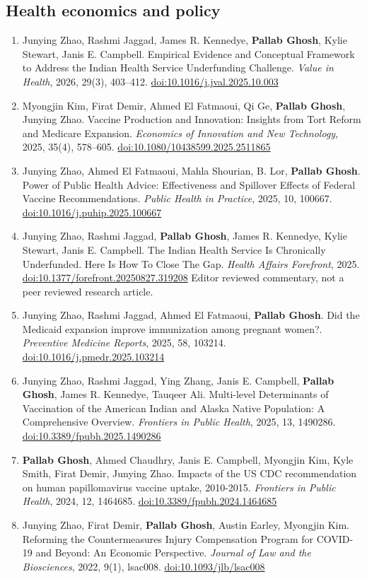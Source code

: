 \documentclass[10.5pt]{article}
\begin{document}
\subsection{Health economics and policy}
\begin{enumerate}
\item Junying Zhao, Rashmi Jaggad, James R. Kennedye, \textbf{Pallab Ghosh}, Kylie Stewart, Janis E. Campbell. Empirical Evidence and Conceptual Framework to Address the Indian Health Service Underfunding Challenge. \emph{Value in Health}, 2026, 29(3), 403--412. \href{https://doi.org/10.1016/j.jval.2025.10.003}{doi:10.1016/j.jval.2025.10.003}
\item Myongjin Kim, Firat Demir, Ahmed El Fatmaoui, Qi Ge, \textbf{Pallab Ghosh}, Junying Zhao. Vaccine Production and Innovation: Insights from Tort Reform and Medicare Expansion. \emph{Economics of Innovation and New Technology}, 2025, 35(4), 578--605. \href{https://doi.org/10.1080/10438599.2025.2511865}{doi:10.1080/10438599.2025.2511865}
\item Junying Zhao, Ahmed El Fatmaoui, Mahla Shourian, B. Lor, \textbf{Pallab Ghosh}. Power of Public Health Advice: Effectiveness and Spillover Effects of Federal Vaccine Recommendations. \emph{Public Health in Practice}, 2025, 10, 100667. \href{https://doi.org/10.1016/j.puhip.2025.100667}{doi:10.1016/j.puhip.2025.100667}
\item Junying Zhao, Rashmi Jaggad, \textbf{Pallab Ghosh}, James R. Kennedye, Kylie Stewart, Janis E. Campbell. The Indian Health Service Is Chronically Underfunded. Here Is How To Close The Gap. \emph{Health Affairs Forefront}, 2025. \href{https://doi.org/10.1377/forefront.20250827.319208}{doi:10.1377/forefront.20250827.319208} {\footnotesize Editor reviewed commentary, not a peer reviewed research article.}
\item Junying Zhao, Rashmi Jaggad, Ahmed El Fatmaoui, \textbf{Pallab Ghosh}. Did the Medicaid expansion improve immunization among pregnant women?. \emph{Preventive Medicine Reports}, 2025, 58, 103214. \href{https://doi.org/10.1016/j.pmedr.2025.103214}{doi:10.1016/j.pmedr.2025.103214}
\item Junying Zhao, Rashmi Jaggad, Ying Zhang, Janis E. Campbell, \textbf{Pallab Ghosh}, James R. Kennedye, Tauqeer Ali. Multi-level Determinants of Vaccination of the American Indian and Alaska Native Population: A Comprehensive Overview. \emph{Frontiers in Public Health}, 2025, 13, 1490286. \href{https://doi.org/10.3389/fpubh.2025.1490286}{doi:10.3389/fpubh.2025.1490286}
\item \textbf{Pallab Ghosh}, Ahmed Chaudhry, Janis E. Campbell, Myongjin Kim, Kyle Smith, Firat Demir, Junying Zhao. Impacts of the US CDC recommendation on human papillomavirus vaccine uptake, 2010-2015. \emph{Frontiers in Public Health}, 2024, 12, 1464685. \href{https://doi.org/10.3389/fpubh.2024.1464685}{doi:10.3389/fpubh.2024.1464685}
\item Junying Zhao, Firat Demir, \textbf{Pallab Ghosh}, Austin Earley, Myongjin Kim. Reforming the Countermeasures Injury Compensation Program for COVID-19 and Beyond: An Economic Perspective. \emph{Journal of Law and the Biosciences}, 2022, 9(1), lsac008. \href{https://doi.org/10.1093/jlb/lsac008}{doi:10.1093/jlb/lsac008}
\end{enumerate}
\end{document}
